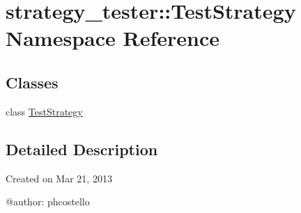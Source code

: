 \hypertarget{namespacestrategy__tester_1_1TestStrategy}{\section{strategy\-\_\-tester\-:\-:\-Test\-Strategy \-Namespace \-Reference}
\label{namespacestrategy__tester_1_1TestStrategy}
}
\subsection*{\-Classes}
\begin{DoxyCompactItemize}
\item 
class \hyperlink{classstrategy__tester_1_1TestStrategy_1_1TestStrategy}{\-Test\-Strategy}
\end{DoxyCompactItemize}


\subsection{\-Detailed \-Description}
\begin{DoxyVerb}
Created on Mar 21, 2013

@author: phcostello
\end{DoxyVerb}
 